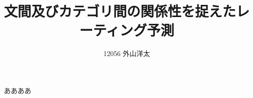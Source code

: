 \documentclass{ttisummary}
\title{文間及びカテゴリ間の関係性を捉えたレーティング予測}
\author{12056 外山洋太}
\date{}
\begin{document}
ああああ
\end{document}
